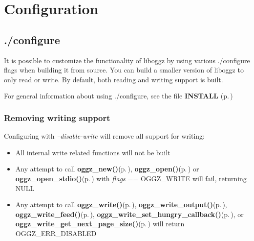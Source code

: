 \section{Configuration}
\label{group__configuration}
\subsection{./configure}\label{configure}
It is possible to customize the functionality of liboggz by using various ./configure flags when building it from source. You can build a smaller version of liboggz to only read or write. By default, both reading and writing support is built.

For general information about using ./configure, see the file {\bf INSTALL }{\rm (p.\,\pageref{group__install})}\subsubsection{Removing writing support}\label{no_encode}
Configuring with {\em --disable-write\/} will remove all support for writing:\begin{itemize}
\item All internal write related functions will not be built\item Any attempt to call {\bf oggz\_\-new()}{\rm (p.\,\pageref{oggz_8h_a4})}, {\bf oggz\_\-open()}{\rm (p.\,\pageref{oggz_8h_a5})} or {\bf oggz\_\-open\_\-stdio()}{\rm (p.\,\pageref{oggz_8h_a6})} with {\em flags\/} == OGGZ\_\-WRITE will fail, returning NULL\item Any attempt to call {\bf oggz\_\-write()}{\rm (p.\,\pageref{group__write__api_ga4})}, {\bf oggz\_\-write\_\-output()}{\rm (p.\,\pageref{group__write__api_ga3})}, {\bf oggz\_\-write\_\-feed()}{\rm (p.\,\pageref{group__write__api_ga2})}, {\bf oggz\_\-write\_\-set\_\-hungry\_\-callback()}{\rm (p.\,\pageref{group__write__api_ga1})}, or {\bf oggz\_\-write\_\-get\_\-next\_\-page\_\-size()}{\rm (p.\,\pageref{group__write__api_ga5})} will return OGGZ\_\-ERR\_\-DISABLED\end{itemize}
